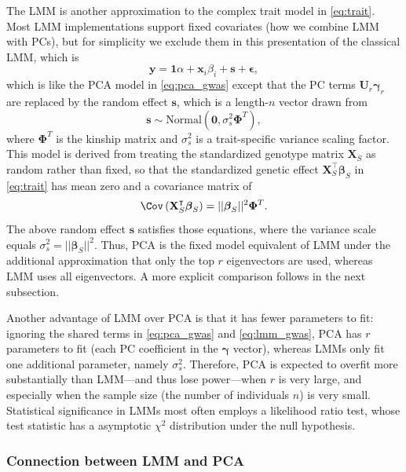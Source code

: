 \documentclass[11pt]{article}
\begin{document}
The LMM is another approximation to the complex trait model in \cref{eq:trait}.
Most LMM implementations support fixed covariates (how we combine LMM with PCs), but for simplicity we exclude them in this presentation of the classical LMM, which is
\begin{equation}
  \label{eq:lmm_gwas}
  \mathbf{y}
  =
  \mathbf{1} \alpha + \mathbf{x}_i \beta_i + \mathbf{s} + \boldsymbol{\epsilon}
  ,
\end{equation}
which is like the PCA model in \cref{eq:pca_gwas} except that the PC terms $\mathbf{U}_r \boldsymbol{\gamma}_r$ are replaced by the random effect $\mathbf{s}$, which is a length-$n$ vector drawn from \citep{sul_population_2018}
$$
\mathbf{s} \sim \text{Normal} \left( \mathbf{0}, \sigma^2_s \mathbf{\Phi}^T \right),
$$
where $\mathbf{\Phi}^T$ is the kinship matrix and $\sigma^2_s$ is a trait-specific variance scaling factor.
This model is derived from treating the standardized genotype matrix $\mathbf{X}_S$ as random rather than fixed, so that the standardized genetic effect
$\mathbf{X}_S^\intercal \boldsymbol{\beta}_S$
in \cref{eq:trait} has mean zero and a covariance matrix of
$$
\Cov \left( \mathbf{X}_S^\intercal \boldsymbol{\beta}_S \right)
=
|| \boldsymbol{\beta}_S ||^2 \mathbf{\Phi}^T
.
$$
The above random effect $\mathbf{s}$ satisfies those equations, where the variance scale equals $\sigma^2_s = || \boldsymbol{\beta}_S ||^2$.
Thus, PCA is the fixed model equivalent of LMM under the additional approximation that only the top $r$ eigenvectors are used, whereas LMM uses all eigenvectors.
A more explicit comparison follows in the next subsection.

Another advantage of LMM over PCA is that it has fewer parameters to fit: ignoring the shared terms in \cref{eq:pca_gwas} and \cref{eq:lmm_gwas}, PCA has $r$ parameters to fit (each PC coefficient in the $\boldsymbol{\gamma}$ vector), whereas LMMs only fit one additional parameter, namely $\sigma^2_s$.
Therefore, PCA is expected to overfit more substantially than LMM---and thus lose power---when $r$ is very large, and especially when the sample size (the number of individuals $n$) is very small.
Statistical significance in LMMs most often employs a likelihood ratio test, whose test statistic has a asymptotic $\chi^2$ distribution under the null hypothesis.

\subsubsection{Connection between LMM and PCA}
\end{document}
